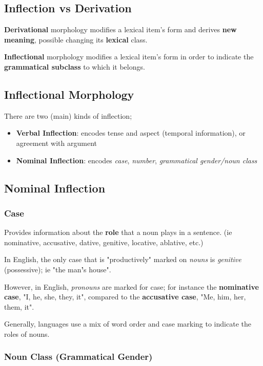 \documentclass[12pt]{article}
\begin{document}
\subsection{Inflection vs Derivation}

\textbf{Derivational} morphology modifies a lexical item's form and derives \textbf{new meaning}, possible changing its \textbf{lexical} class.

\textbf{Inflectional} morphology modifies a lexical item's form in order to indicate the \textbf{grammatical subclass} to which it belongs.

\subsection{Inflectional Morphology}

There are two (main) kinds of inflection;
\begin{itemize}
  \item \textbf{Verbal Inflection}: encodes tense and aspect (temporal information), or agreement with argument
  \item \textbf{Nominal Inflection}:  encodes \textit{case}, \textit{number}, \textit{grammatical gender/noun class}
\end{itemize}

\subsection{Nominal Inflection}

\subsubsection{Case}
Provides information about the \textbf{role} that a noun plays in a sentence. (ie nominative, accusative, dative, genitive, locative, ablative, etc.)

In English, the only case that is "productively" marked on \textit{nouns} is \textit{genitive} (possessive); ie "the man\textbf{'}s house".

However, in English, \textit{pronouns} are marked for case; for instance the \textbf{nominative case}, "I, he, she, they, it", compared to the \textbf{accusative case}, "Me, him, her, them, it".

Generally, languages use a mix of word order and case marking to indicate the roles of nouns.

\subsubsection{Noun Class (Grammatical Gender)}
\end{document}
